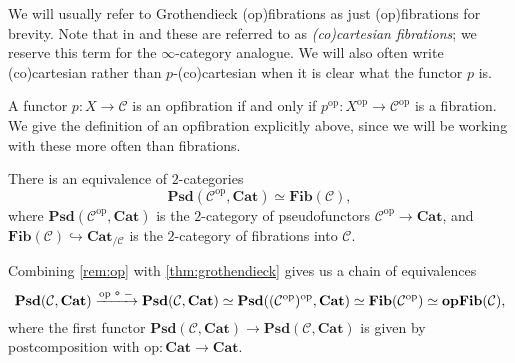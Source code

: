 \documentclass{MetricNotes2023}
\newcommand{\circo}{~\raisebox{1pt}{\tikz \draw[line width=0.6pt] circle(1.1pt);}~}
\begin{document}
We will usually refer to Grothendieck (op)fibrations as just (op)fibrations for brevity. Note that in \autocite{symmetricmonoidal} and \autocite{lurie2008higher} these are referred to as \textit{(co)cartesian fibrations}; we reserve this term for the \(\infty\)-category analogue. We will also often write (co)cartesian rather than \(p\)-(co)cartesian when it is clear what the functor \(p\) is.

\begin{remark}\label{rem:op}
A functor \(p : X \to \mathcal{C}\) is an opfibration if and only if \(p^{\text{op}} : X^{\text{op}}\to \mathcal{C}^{\text{op}}\) is a fibration. We give the definition of an opfibration explicitly above, since we will be working with these more often than fibrations.  
\end{remark}


\begin{theorem}\label{thm:grothendieck}
There is an equivalence of \(2\)-categories 
\[\textbf{Psd}(\mathcal{C}^{\text{op}}, \textbf{Cat})\simeq \textbf{Fib}(\mathcal{C}),\]
where \(\textbf{Psd}(\mathcal{C}^{\text{op}}, \textbf{Cat})\) is the \(2\)-category of pseudofunctors \(\mathcal{C}^{\text{op}}\to \textbf{Cat}\), and \(\textbf{Fib}(\mathcal{C})\hookrightarrow \textbf{Cat}_{/\mathcal{C}}\) is the \(2\)-category of fibrations into \(\mathcal{C}\). 
\end{theorem}

\begin{remark}\label{rem:ophell}
Combining \ref{rem:op} with \ref{thm:grothendieck} gives us a chain of equivalences
\[\textbf{Psd}(\mathcal{C}, \textbf{Cat})\xrightarrow{\text{op} \circo -} \textbf{Psd}(\mathcal{C}, \textbf{Cat})\simeq \textbf{Psd}((\mathcal{C}^{\text{op}})^{\text{op}}, \textbf{Cat}) \simeq \textbf{Fib}(\mathcal{C}^{\text{op}}) \simeq \textbf{opFib}(\mathcal{C}),\]
where the first functor \(\textbf{Psd}(\mathcal{C}, \textbf{Cat}) \to \textbf{Psd}(\mathcal{C}, \textbf{Cat})\) is given by postcomposition with \(\text{op} : \textbf{Cat}\to \textbf{Cat}\).  
\end{remark}
\end{document}
